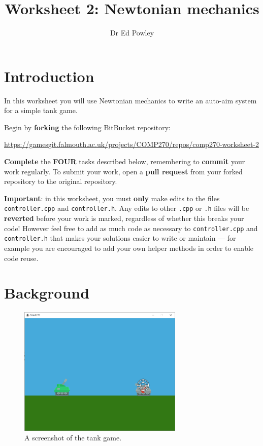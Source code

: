 \documentclass{../../../fal_assignment}
\title{Worksheet 2: Newtonian mechanics}
\author{Dr Ed Powley}
\begin{document}
\maketitle

\section*{Introduction}

In this worksheet you will use Newtonian mechanics to write an auto-aim system for a simple tank game.

Begin by \textbf{forking} the following BitBucket repository:

\begin{center}
	\url{https://gamesgit.falmouth.ac.uk/projects/COMP270/repos/comp270-worksheet-2}
\end{center}

\textbf{Complete} the \textbf{FOUR} tasks described below, remembering to \textbf{commit} your work regularly.
To submit your work, open a \textbf{pull request} from your forked repository to the original repository.

\textbf{Important}: in this worksheet, you must \textbf{only} make edits to the files \texttt{controller.cpp} and \texttt{controller.h}.
Any edits to other \texttt{.cpp} or \texttt{.h} files will be \textbf{reverted} before your work is marked, regardless of whether this breaks your code!
However feel free to add as much code as necessary to \texttt{controller.cpp} and \texttt{controller.h} that makes your solutions easier to write or maintain ---
for example you are encouraged to add your own helper methods in order to enable code reuse.

\section*{Background}

\begin{figure}[ht]
	\begin{center}
		\includegraphics[width=0.7\textwidth]{game}
	\end{center}
	\caption{A screenshot of the tank game.}
	\label{fig:game}
\end{figure}
\end{document}
